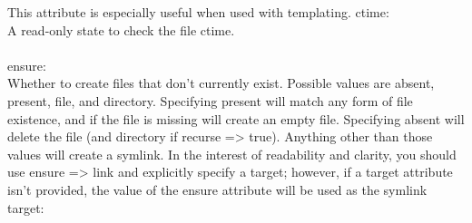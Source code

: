 	This attribute is especially useful when used with templating.
%
ctime:\\
A read-only state to check the file ctime.\\\\
%
ensure:\\
Whether to create files that don't currently exist. Possible values are absent, present, file, and directory. Specifying present will match any form of file existence, and if the file is missing will create an empty file. Specifying absent will delete the file (and directory if recurse => true).
Anything other than those values will create a symlink. In the interest of readability and clarity, you should use ensure => link and explicitly specify a target; however, if a target attribute isn't provided, the value of the ensure attribute will be used as the symlink target:

